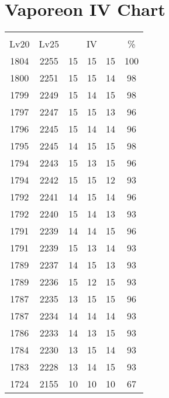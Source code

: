 \documentclass{article}%
\begin{document}
%
\normalsize%
\section{Vaporeon IV Chart}%
\label{sec:Vaporeon IV Chart}%
\renewcommand{\arraystretch}{1.5}%
\begin{tabular}{|c|c|c|c|c|c|}%
\hline%
\multicolumn{6}{|c|}{\textcolor{white}{ 
\linebreak{Vaporeon}
}%
\cellcolor{black}}\\%
\multicolumn{1}{|c}{Lv20}&\multicolumn{1}{c|}{Lv25}&\multicolumn{3}{c|}{IV}&\multicolumn{1}{|c|}{\%}\\%
\hline%
\rowcolor{color100}%
1804&2255&15&15&15&100\\%
\hline%
\rowcolor{color98}%
1800&2251&15&15&14&98\\%
\hline%
\rowcolor{color98}%
1799&2249&15&14&15&98\\%
\hline%
\rowcolor{color96}%
1797&2247&15&15&13&96\\%
\hline%
\rowcolor{color96}%
1796&2245&15&14&14&96\\%
\hline%
\rowcolor{color98}%
1795&2245&14&15&15&98\\%
\hline%
\rowcolor{color96}%
1794&2243&15&13&15&96\\%
\hline%
\rowcolor{color93}%
1794&2242&15&15&12&93\\%
\hline%
\rowcolor{color96}%
1792&2241&14&15&14&96\\%
\hline%
\rowcolor{color93}%
1792&2240&15&14&13&93\\%
\hline%
\rowcolor{color96}%
1791&2239&14&14&15&96\\%
\hline%
\rowcolor{color93}%
1791&2239&15&13&14&93\\%
\hline%
\rowcolor{color93}%
1789&2237&14&15&13&93\\%
\hline%
\rowcolor{color93}%
1789&2236&15&12&15&93\\%
\hline%
\rowcolor{color96}%
1787&2235&13&15&15&96\\%
\hline%
\rowcolor{color93}%
1787&2234&14&14&14&93\\%
\hline%
\rowcolor{color93}%
1786&2233&14&13&15&93\\%
\hline%
\rowcolor{color93}%
1784&2230&13&15&14&93\\%
\hline%
\rowcolor{color93}%
1783&2228&13&14&15&93\\%
\hline%
\rowcolor{color91}%
1724&2155&10&10&10&67\\%
\end{tabular}

%
\end{document}
